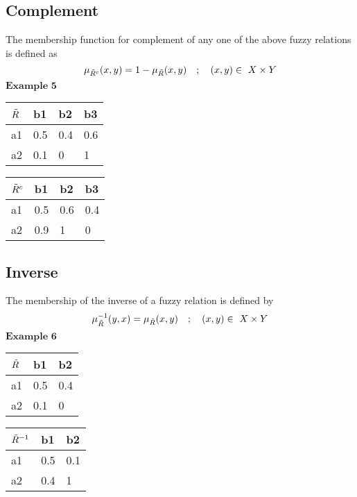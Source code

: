 \documentclass{article}
\begin{document}
\subsection{Complement}
The membership function for complement of any one of the above fuzzy relations is defined as
\begin{equation}
\mu_{\Tilde{R}^c}(x,y)=1-\mu_{\Tilde{R}}(x,y)\quad  ;\quad (x,y)\in\ X\times Y  
\end{equation}
$\textbf{Example 5}$\newline
\begin{center}
\def\arraystretch{1.4}%
\begin{tabular}{ | m{1cm} | m{1cm}| m{1cm} | m{1cm} |} 
  \hline
  $\Tilde{R}$& b1 & b2 &b3 \\ 
  \hline
  a1  & 0.5 & 0.4 & 0.6 \\ 
  \hline
  a2 & 0.1 & 0 & 1 \\ 
  \hline
\end{tabular}
\quad
\def\arraystretch{1.4}%
\begin{tabular}{ | m{1cm} | m{1cm}| m{1cm} |m{1cm} | } 
  \hline
  $\Tilde{R}^c$& b1 & b2 & b3 \\ 
  \hline
  a1  & 0.5 & 0.6 & 0.4 \\ 
  \hline
  a2 & 0.9 & 1 & 0 \\ 
  \hline
\end{tabular}
\end{center}
\subsection{Inverse}
The membership of the inverse of a fuzzy relation is defined by
\begin{equation}
\mu^{-1}_{\Tilde{R}}(y,x)=\mu_{\Tilde{R}}(x,y)\quad  ;\quad (x,y)\in\ X\times Y
\end{equation}
$\textbf{Example 6}$\newline
\begin{center}
\def\arraystretch{1.4}%
\begin{tabular}{ | m{1cm} | m{1cm}| m{1cm} | } 
  \hline
  $\Tilde{R}$& b1 & b2 \\ 
  \hline
  a1  & 0.5 & 0.4 \\ 
  \hline
  a2 & 0.1 & 0 \\ 
  \hline
\end{tabular}
\quad
\def\arraystretch{1.4}%
\begin{tabular}{ | m{1cm} | m{1cm}| m{1cm} | } 
  \hline
  $\Tilde{R}^{-1}$& b1 & b2 \\ 
  \hline
  a1  & 0.5 & 0.1 \\ 
  \hline
  a2 & 0.4 & 1 \\ 
  \hline
\end{tabular}
\end{center}
\end{document}
